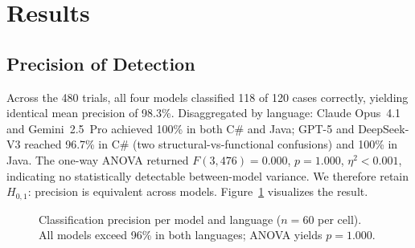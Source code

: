 \documentclass[twocolumn,11pt]{article}
\begin{document}
    \section{Results}\label{sec:results}
    \subsection{Precision of Detection}
    Across the 480 trials, all four models classified 118 of 120 cases correctly, yielding identical mean precision of 98.3\%. Disaggregated by language: Claude Opus~4.1 and Gemini~2.5~Pro achieved 100\% in both C\# and Java; GPT-5 and DeepSeek-V3 reached 96.7\% in C\# (two structural-vs-functional confusions) and 100\% in Java. The one-way ANOVA returned $F(3,476) = 0.000$, $p = 1.000$, $\eta^2 < 0.001$, indicating no statistically detectable between-model variance. We therefore retain $H_{0,1}$: precision is equivalent across models. Figure~\ref{fig:precision} visualizes the result.
    \begin{figure}[!t]
    \centering
    \caption{Classification precision per model and language ($n=60$ per cell). All models exceed 96\% in both languages; ANOVA yields $p = 1.000$.}
    \label{fig:precision}
    \end{figure}
\end{document}

